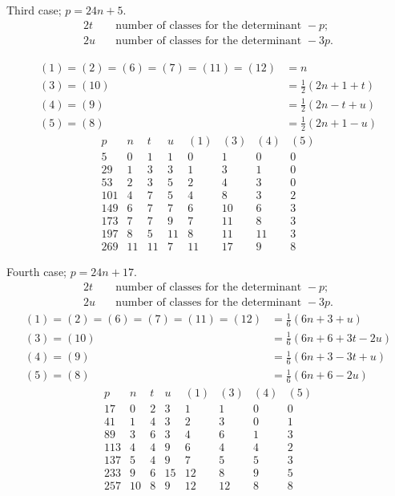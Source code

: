 Third case; $p=24n+5$.
\[
\begin{aligned}
2t&\quad\text{number of classes for the determinant }-p;\\
2u&\quad\text{number of classes for the determinant }-3p.
\end{aligned}
\]

\[
\begin{aligned}
(1)=(2)=(6)=(7)=(11)=(12)&=n\\
(3)=(10)&=\tfrac12(2n+1+t)\\
(4)=(9)&=\tfrac12(2n-t+u)\\
(5)=(8)&=\tfrac12(2n+1-u)
\end{aligned}
\]
\[
\begin{array}{r|r|r|r|r|r|r|r}
p&n&t&u&(1)&(3)&(4)&(5)\\\hline
5&0&1&1&0&1&0&0\\
29&1&3&3&1&3&1&0\\
53&2&3&5&2&4&3&0\\
101&4&7&5&4&8&3&2\\
149&6&7&7&6&10&6&3\\
173&7&7&9&7&11&8&3\\
197&8&5&11&8&11&11&3\\
269&11&11&7&11&17&9&8
\end{array}
\]

Fourth case; $p=24n+17$.
\[
\begin{aligned}
2t&\quad\text{number of classes for the determinant }-p;\\
2u&\quad\text{number of classes for the determinant }-3p.
\end{aligned}
\]
\[
\begin{aligned}
(1)=(2)=(6)=(7)=(11)=(12)&=\tfrac16(6n+3+u)\\
(3)=(10)&=\tfrac16(6n+6+3t-2u)\\
(4)=(9)&=\tfrac16(6n+3-3t+u)\\
(5)=(8)&=\tfrac16(6n+6-2u)
\end{aligned}
\]
\[
\begin{array}{r|r|r|r|r|r|r|r}
p&n&t&u&(1)&(3)&(4)&(5)\\\hline
17&0&2&3&1&1&0&0\\
41&1&4&3&2&3&0&1\\
89&3&6&3&4&6&1&3\\
113&4&4&9&6&4&4&2\\
137&5&4&9&7&5&5&3\\
233&9&6&15&12&8&9&5\\
257&10&8&9&12&12&8&8
\end{array}
\]
